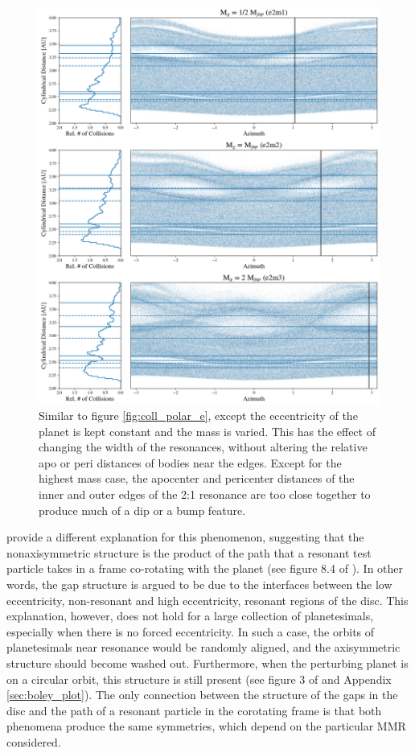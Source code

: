 \documentclass[fleqn,usenatbib]{mnras}
\begin{document}
\begin{figure}
    \includegraphics[width=\textwidth]{figures/coll_polar_m.png}
    \caption{Similar to figure \ref{fig:coll_polar_e}, except the eccentricity of the planet is kept constant and the mass is varied.
    This has the effect of changing the width of the resonances, without altering the relative apo or peri distances of
    bodies near the edges. Except for the highest mass case, the apocenter and pericenter distances of the inner and outer edges of the 2:1 
    resonance are too close together to produce much of a dip or a bump feature.\label{fig:coll_polar_m}}
\end{figure}

\citet{2016ApJ...818..159T} provide a different explanation for this phenomenon, suggesting that the nonaxisymmetric structure is the product 
of the path that a resonant test particle takes in a frame co-rotating with the planet (see figure 8.4 of \citet{1999ssd..book.....M}). In other words, the gap structure is argued to be 
due to the interfaces between the low eccentricity, non-resonant and high eccentricity, resonant regions of the disc. This explanation, 
however, does not hold for a large collection of planetesimals, especially when there is no forced eccentricity. In such a case, the orbits of 
planetesimals near resonance would be randomly aligned, and the axisymmetric structure should become washed out. Furthermore, when the perturbing 
planet is on a circular orbit, this structure is still present (see figure 3 of \citet{2016ApJ...818..159T} and Appendix \ref{sec:boley_plot}). The only 
connection between the structure of the gaps in the disc and the path of a resonant particle in the corotating frame is that both phenomena produce the 
same symmetries, which depend on the particular MMR considered.
\end{document}
